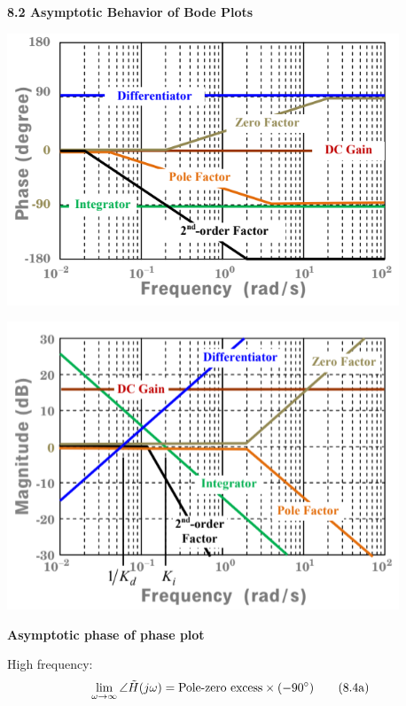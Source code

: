 \documentclass[landscape,a4paper]{extarticle}
\newenvironment{Figure}
  {\par\medskip\noindent\minipage{\linewidth}}
  {\endminipage\par\medskip}
\begin{document}
\begin{multicols*}{5}
    \textbf{8.2 Asymptotic Behavior of Bode Plots}
    \begin{Figure}
        \centering
        \includegraphics[width=\linewidth]{bode1.png}        
    \end{Figure}
    \begin{Figure}
        \centering
        \includegraphics[width=\linewidth]{bode2.png}        
    \end{Figure}

    \textbf{Asymptotic phase of phase plot}

    High frequency:
    \begin{align*}
        \lim_{\omega \to \infty} \angle \tilde{H}(j \omega) = \text{Pole-zero excess} \times (-90 \degree) \tag{8.4a}
    \end{align*}


\end{multicols*}
\end{document}
